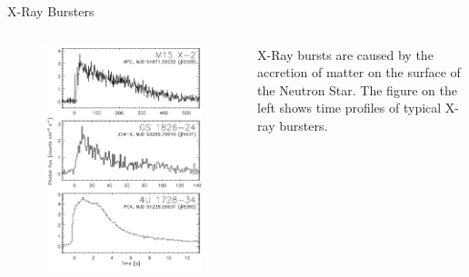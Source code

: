 \documentclass[12pt, aspectratio=169]{beamer}
\begin{document}
\begin{frame}{X-Ray Bursters}
  
\begin{columns}
             \centering
               \begin{figure}
                 \includegraphics[width=\textwidth]{graph_burster.jpg}
               \end{figure}

              X-Ray bursts are caused by the accretion of matter on the surface of the Neutron Star. The figure on the left shows time profiles of typical X-ray bursters.
         \end{columns} 

\end{frame}
\end{document}
